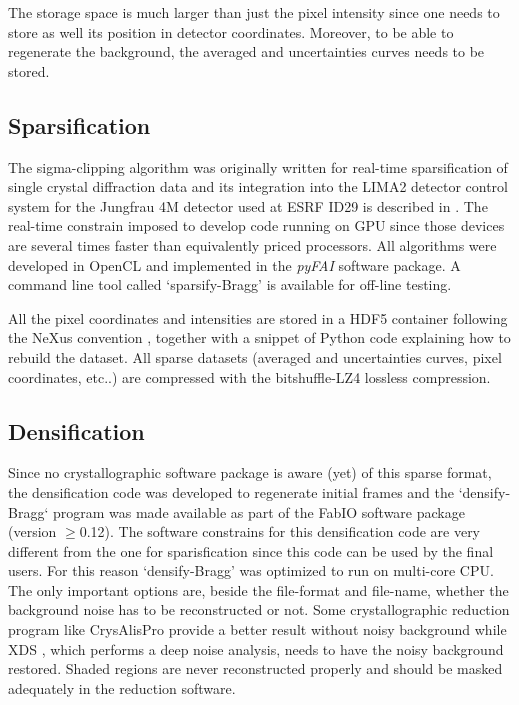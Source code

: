 \documentclass[preprint]{iucr}              %
\begin{document}
The storage space is much larger than just the pixel intensity since one needs to store as well its position in detector coordinates. 
Moreover, to be able to regenerate the background, the averaged and uncertainties curves needs to be stored.



\subsection{Sparsification}

The sigma-clipping algorithm was originally written for real-time sparsification of single crystal diffraction data and its integration into the LIMA2 detector control system \cite{lima} for the Jungfrau 4M detector used at ESRF ID29 is described in \cite{sri2021}.
The real-time constrain imposed to develop code running on GPU since those devices are several times
faster than equivalently priced processors.
All algorithms were developed in OpenCL \cite{opencl_khronos} and implemented in the \textit{pyFAI} software package.
A command line tool called `sparsify-Bragg' is available for off-line testing.

All the pixel coordinates and intensities are stored in a HDF5 container \cite{hdf5} following the NeXus  convention \cite{nexus}, together with a snippet of Python code explaining how to rebuild the dataset.
All sparse datasets (averaged and uncertainties curves, pixel coordinates, etc..) are compressed with the bitshuffle-LZ4 \cite{bitshuffle} lossless compression.

\subsection{Densification}
Since no crystallographic software package is aware (yet) of this sparse format, the densification code was developed to regenerate initial frames and the `densify-Bragg` program was made available as part of the FabIO \cite{fabio} software package (version $\ge$0.12). 
The software constrains for this densification code are very different from the one for sparisfication since this code can be used by the final users.
For this reason `densify-Bragg' was optimized to run on multi-core CPU.
The only important options are, beside the file-format and file-name, whether the background noise has to be reconstructed or not. 
Some crystallographic reduction program like CrysAlisPro \cite{crysalis} provide a better result without noisy background while XDS \cite{xds}, which performs a deep noise analysis, needs to have the noisy background restored. 
Shaded regions are never reconstructed properly and should be masked adequately in the reduction software.
\end{document}
